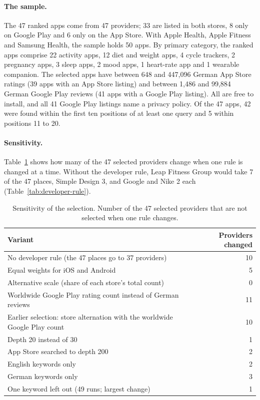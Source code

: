 \paragraph{The sample.} The 47 ranked apps come from 47 providers; 33 are listed
in both stores, 8 only on Google Play and 6 only on the App Store. With Apple
Health, Apple Fitness and Samsung Health, the sample holds 50 apps. By primary
category, the ranked apps comprise 22 activity apps, 12 diet and weight apps, 4
cycle trackers, 2 pregnancy apps, 3 sleep apps, 2 mood apps, 1 heart-rate app and
1 wearable companion. The selected apps have between 648 and 447{,}096 German App
Store ratings (39 apps with an App Store listing) and between 1{,}486 and
99{,}884 German Google Play reviews (41 apps with a Google Play listing). All are
free to install, and all 41 Google Play listings name a privacy policy. Of the
47 apps, 42 were found within the first ten positions of at least one query and
5 within positions 11 to 20.

\paragraph{Sensitivity.} Table~\ref{tab:sensitivity} shows how many of the 47
selected providers change when one rule is changed at a time. Without the
developer rule, Leap Fitness Group would take 7 of the 47 places, Simple Design
3, and Google and Nike 2 each (Table~\ref{tab:developer-rule}).

\begin{table}[t]
\centering
\begin{singlespace}
\caption[Sensitivity of the selection]{Sensitivity of the selection. Number of the 47 selected providers that
are not selected when one rule changes.}
\label{tab:sensitivity}
\small
\begin{tabularx}{\textwidth}{@{}Xr@{}}
\toprule
\textbf{Variant} & \textbf{Providers changed} \\
\midrule
No developer rule (the 47 places go to 37 providers) & 10 \\
Equal weights for iOS and Android & 5 \\
Alternative scale (share of each store's total count) & 0 \\
Worldwide Google Play rating count instead of German reviews & 11 \\
Earlier selection: store alternation with the worldwide Google Play count & 10 \\
Depth 20 instead of 30 & 1 \\
App Store searched to depth 200 & 2 \\
English keywords only & 2 \\
German keywords only & 3 \\
One keyword left out (49 runs; largest change) & 1 \\
\bottomrule
\end{tabularx}
\end{singlespace}
\end{table}

